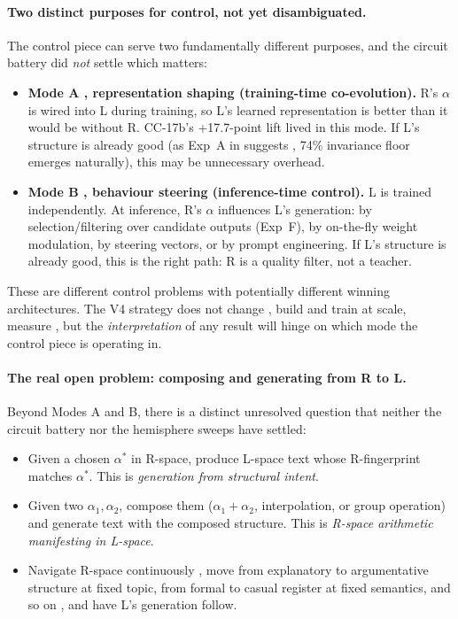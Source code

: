 \documentclass[10pt, twocolumn, a4paper]{article}
\begin{document}
\paragraph{Two distinct purposes for control, not yet disambiguated.}
The control piece can serve two fundamentally different purposes, and the circuit battery did \emph{not} settle which matters:

\begin{itemize}[nosep,leftmargin=*]
\item \textbf{Mode A ,  representation shaping (training-time co-evolution).} R's $\alpha$ is wired into L during training, so L's learned representation is better than it would be without R. CC-17b's +17.7-point lift lived in this mode. If L's structure is already good (as Exp~A in \cite{gauge-v2} suggests ,  74\% invariance floor emerges naturally), this may be unnecessary overhead.
\item \textbf{Mode B ,  behaviour steering (inference-time control).} L is trained independently. At inference, R's $\alpha$ influences L's generation: by selection/filtering over candidate outputs (Exp~F), by on-the-fly weight modulation, by steering vectors, or by prompt engineering. If L's structure is already good, this is the right path: R is a quality filter, not a teacher.
\end{itemize}

These are different control problems with potentially different winning architectures. The V4 strategy does not change ,  build and train at scale, measure ,  but the \emph{interpretation} of any result will hinge on which mode the control piece is operating in.

\paragraph{The real open problem: composing and generating from R to L.}
Beyond Modes A and B, there is a distinct unresolved question that neither the circuit battery nor the hemisphere sweeps have settled:

\begin{itemize}[nosep,leftmargin=*]
\item Given a chosen $\alpha^*$ in R-space, produce L-space text whose R-fingerprint matches $\alpha^*$. This is \emph{generation from structural intent}.
\item Given two $\alpha_1, \alpha_2$, compose them ($\alpha_1 + \alpha_2$, interpolation, or group operation) and generate text with the composed structure. This is \emph{R-space arithmetic manifesting in L-space}.
\item Navigate R-space continuously ,  move from explanatory to argumentative structure at fixed topic, from formal to casual register at fixed semantics, and so on ,  and have L's generation follow.
\end{itemize}
\end{document}
